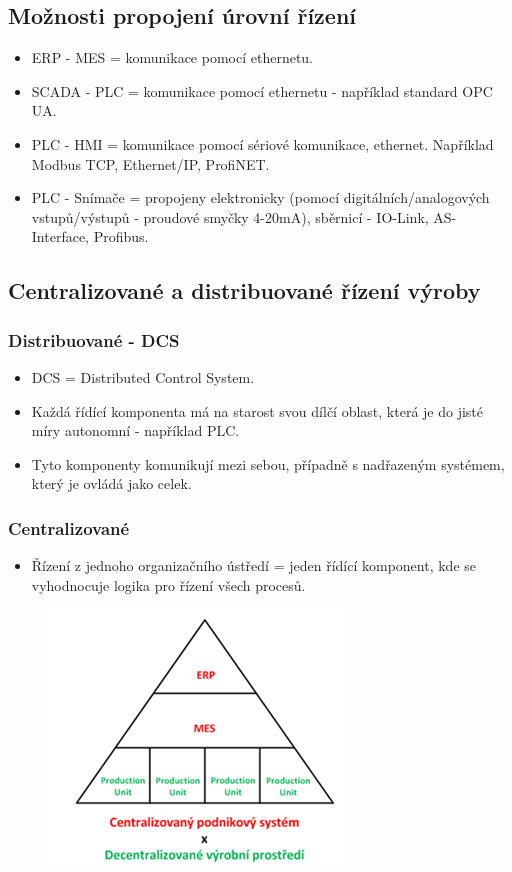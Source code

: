 \subsection{Možnosti propojení úrovní řízení}
\begin{itemize}
    \item ERP - MES = komunikace pomocí ethernetu.
    \item SCADA - PLC = komunikace pomocí ethernetu - například standard OPC UA.
    \item PLC - HMI = komunikace pomocí sériové komunikace, ethernet. Například Modbus TCP, Ethernet/IP, ProfiNET.
    \item PLC - Snímače = propojeny elektronicky (pomocí digitálních/analogových vstupů/výstupů - proudové smyčky 4-20mA), sběrnicí - IO-Link, AS-Interface, Profibus.
\end{itemize}

\subsection{Centralizované a distribuované řízení výroby}
\subsubsection*{Distribuované - DCS}
\begin{itemize}
    \item DCS = Distributed Control System.
    \item Každá řídící komponenta má na starost svou dílčí oblast, která je do jisté míry autonomní - například PLC.
    \item Tyto komponenty komunikují mezi sebou, případně s nadřazeným systémem, který je ovládá jako celek.
\end{itemize}

\subsubsection*{Centralizované}
\begin{itemize}
    \item Řízení z jednoho organizačního ústředí = jeden řídící komponent, kde se vyhodnocuje logika pro řízení všech procesů.
\end{itemize}

\begin{figure}[h]
    \begin{center}
        \includegraphics[scale = 1]{img/picture2.png}
    \end{center}
\end{figure}

